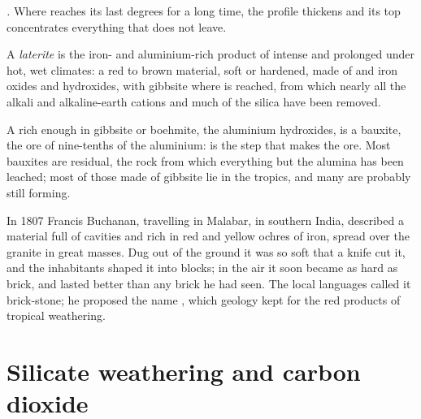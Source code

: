 \emph{.} Where  reaches its last degrees for a long time,
the profile thickens and its top concentrates everything that does not leave.

\begin{definition}[Laterite]\label{def:b1:weathering-clays:laterite}
A \emph{laterite} is the iron- and aluminium-rich product of
intense and prolonged  under hot, wet climates: a red to brown
material, soft or hardened, made of  and iron oxides and hydroxides,
with gibbsite where  is reached, from which nearly all the alkali
and alkaline-earth cations and much of the silica have been removed.
\end{definition}

A  rich enough in gibbsite or boehmite, the aluminium hydroxides, is a
bauxite, the ore of nine-tenths of the aluminium:  is the step that
makes the ore. Most bauxites are residual, the rock from which everything but
the alumina has been leached; most of those made of gibbsite lie in the
tropics, and many are probably still forming.

\begin{history}
In 1807 Francis Buchanan, travelling in Malabar, in southern India, described
a material full of cavities and rich in red and yellow ochres of iron, spread
over the granite in great masses. Dug out of the ground it was so soft that a
knife cut it, and the inhabitants shaped it into blocks; in the air it soon
became as hard as brick, and lasted better than any brick he had seen. The
local languages called it brick-stone; he proposed the name , which
geology kept for the red products of tropical weathering.
\end{history}

\section{Silicate weathering and carbon dioxide}\label{sec:b1:weathering-clays:co2}

